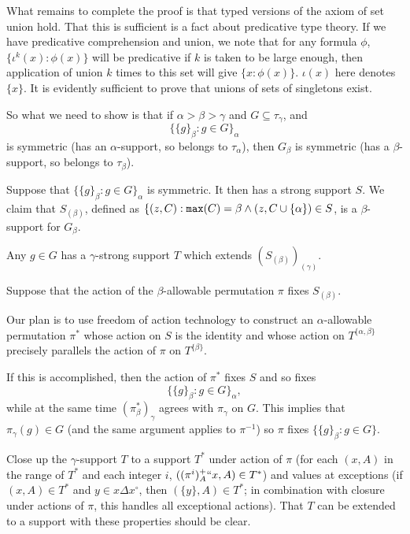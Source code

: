 \documentclass[112pt]{article}
\begin{document}
What remains to complete the proof is that typed versions of the axiom of set union hold.  That this is sufficient is a fact about predicative type theory.
If we have predicative comprehension and union, we note that for any formula $\phi$, $\{\iota^k(x):\phi(x)\}$ will be predicative if $k$ is taken to be large enough, then application of union $k$ times to this set will give $\{x:\phi(x)\}$.  $\iota(x)$ here denotes $\{x\}$.  It is evidently sufficient to prove that unions of sets of singletons exist.

So what we need to show is that if  $\alpha>\beta>\gamma$ and $G \subseteq \tau_\gamma$, and $$\{\{g\}_\beta:g \in G\}_\alpha$$ is symmetric (has an $\alpha$-support, so belongs to $\tau_\alpha$), then $G_\beta$ is symmetric (has a $\beta$-support, so belongs to $\tau_\beta$).

Suppose that $\{\{g\}_\beta:g \in G\}_\alpha$ is symmetric.  It then has a strong support $S$.  We claim that $S_{(\beta)}$, defined as $\{(z,C): {\tt max}(C)=\beta \wedge (z,C\cup \{\alpha\}) \in S$,  is a $\beta$-support for $G_\beta$.

Any $g \in G$ has a $\gamma$-strong support $T$ which extends $(S_{(\beta)})_{(\gamma)}$. 

Suppose that the action of the $\beta$-allowable permutation $\pi$ fixes $S_{(\beta)}$.

Our plan is to use freedom of action technology to construct an $\alpha$-allowable permutation $\pi^*$ whose action on $S$ is the identity
and whose action on $T^{\{\alpha,\beta\}}$ precisely parallels the action of $\pi$ on $T^{\{\beta\}}$.

If this is accomplished, then the action of $\pi^*$ fixes $S$ and so fixes $$\{\{g\}_\beta:g \in G\}_\alpha,$$ while at the same
time $(\pi^*_\beta)_\gamma$ agrees with $\pi_\gamma$ on $G$.  This implies that $\pi_\gamma(g) \in G$ (and the same argument applies to $\pi^{-1}$)
so $\pi$ fixes $\{\{g\}_\beta:g \in G\}$.

Close up the $\gamma$-support $T$ to a support $T^*$ under action of $\pi$ (for each $(x,A)$ in the range of $T^*$ and each integer $i$, $((\pi^i)^+_A``x,A) \in T^*$) and values at exceptions
(if $(x,A) \in T^*$ and $y \in x \Delta x^\circ$, then $(\{y\},A) \in T^*$; in combination with closure under actions of $\pi$, this handles all exceptional actions).  That $T$ can be extended to a support with these properties should be clear.
\end{document}
